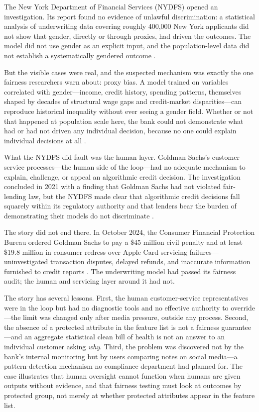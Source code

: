 The New York Department of Financial Services (NYDFS) opened an investigation. Its report found no evidence of unlawful discrimination: a statistical analysis of underwriting data covering roughly 400,000 New York applicants did not show that gender, directly or through proxies, had driven the outcomes. The model did not use gender as an explicit input, and the population-level data did not establish a systematically gendered outcome \autocite{nydfs2021apple}.

But the visible cases were real, and the suspected mechanism was exactly the one fairness researchers warn about: proxy bias. A model trained on variables correlated with gender---income, credit history, spending patterns, themselves shaped by decades of structural wage gaps and credit-market disparities---can reproduce historical inequality without ever seeing a gender field. Whether or not that happened at population scale here, the bank could not demonstrate what had or had not driven any individual decision, because no one could explain individual decisions at all \autocite{nydfs2021apple}.

What the NYDFS did fault was the human layer. Goldman Sachs's customer service processes---the human side of the loop---had no adequate mechanism to explain, challenge, or appeal an algorithmic credit decision. The investigation concluded in 2021 with a finding that Goldman Sachs had not violated fair-lending law, but the NYDFS made clear that algorithmic credit decisions fall squarely within its regulatory authority and that lenders bear the burden of demonstrating their models do not discriminate \autocite{nydfs2021apple}.

The story did not end there. In October 2024, the Consumer Financial Protection Bureau ordered Goldman Sachs to pay a \$45 million civil penalty and at least \$19.8 million in consumer redress over Apple Card servicing failures---uninvestigated transaction disputes, delayed refunds, and inaccurate information furnished to credit reports \autocite{cfpb2024applecard}. The underwriting model had passed its fairness audit; the human and servicing layer around it had not.

The story has several \hitl lessons. First, the human customer-service representatives were in the loop but had no diagnostic tools and no effective authority to override---the limit was changed only after media pressure, outside any process. Second, the absence of a protected attribute in the feature list is not a fairness guarantee---and an aggregate statistical clean bill of health is not an answer to an individual customer asking \emph{why}. Third, the problem was discovered not by the bank's internal monitoring but by users comparing notes on social media---a pattern-detection mechanism no compliance department had planned for. The case illustrates that human oversight cannot function when humans are given outputs without evidence, and that fairness testing must look at outcomes by protected group, not merely at whether protected attributes appear in the feature list.

